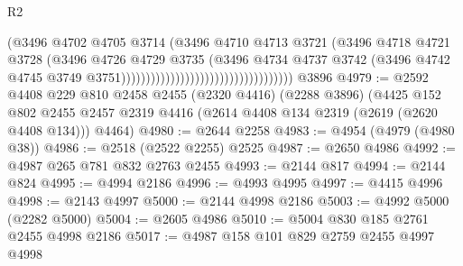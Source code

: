 \begin{lexlean}{R2}
\begin{coremodule}
                                                              (@3496
                                                                @4702
                                                                @4705
                                                                @3714
                                                                (@3496
                                                                  @4710
                                                                  @4713
                                                                  @3721
                                                                  (@3496
                                                                    @4718
                                                                    @4721
                                                                    @3728
                                                                    (@3496
                                                                      @4726
                                                                      @4729
                                                                      @3735
                                                                      (@3496
                                                                        @4734
                                                                        @4737
                                                                        @3742
                                                                        (@3496
                                                                          @4742
                                                                          @4745
                                                                          @3749
                                                                          @3751)))))))))))))))))))))))))))))))))))
    @3896
@4979 := @2592
    @4408
    @229
    @810
    @2458
    @2455
    (@2320 @4416)
    (@2288 @3896)
    (@4425
      @152
      @802
      @2455
      @2457
      @2319
      @4416
      (@2614 @4408 @134 @2319 (@2619 (@2620 @4408 @134)))
      @4464)
@4980 := @2644 @2258
@4983 := @4954 (@4979 (@4980 @38))
@4986 := @2518 (@2522 @2255) @2525
@4987 := @2650 @4986
@4992 := @4987 @265 @781 @832 @2763 @2455
@4993 := @2144 @817
@4994 := @2144 @824
@4995 := @4994 @2186
@4996 := @4993 @4995
@4997 := @4415 @4996
@4998 := @2143 @4997
@5000 := @2144 @4998 @2186
@5003 := @4992 @5000 (@2282 @5000)
@5004 := @2605 @4986
@5010 := @5004 @830 @185 @2761 @2455 @4998 @2186
@5017 := @4987 @158 @101 @829 @2759 @2455 @4997 @4998

\end{coremodule}
\end{lexlean}
